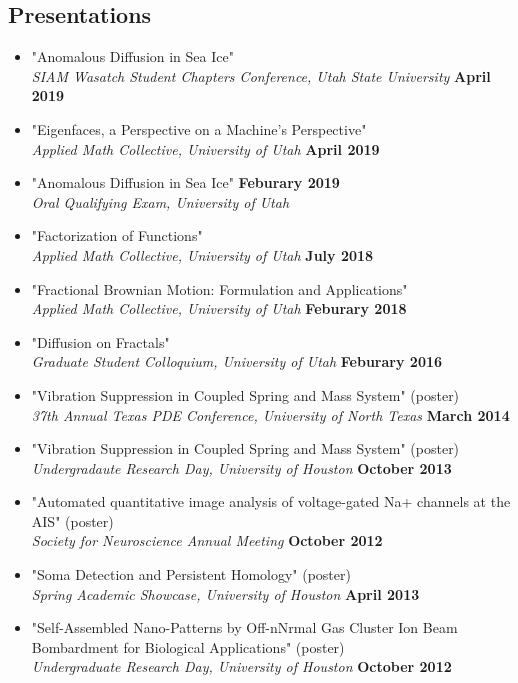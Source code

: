 \documentclass[margin,line]{res}
\begin{document}
\begin{resume}
\section{\sc Presentations}
\begin{itemize}
    \item[] "Anomalous Diffusion in Sea Ice"
        \\{\it SIAM Wasatch Student Chapters Conference, Utah State University} \hfill {\bf April 2019} 
    \item[] "Eigenfaces, a Perspective on a Machine's Perspective"
        \\{\it Applied Math Collective, University of Utah} \hfill {\bf April 2019}
    \item[] "Anomalous Diffusion in Sea Ice" \hfill {\bf Feburary 2019} 
        \\ {\it Oral Qualifying Exam, University of Utah }
    \item[] "Factorization of Functions" 
        \\ {\it Applied Math Collective, University of Utah } \hfill {\bf July 2018} 
    \item[] "Fractional Brownian Motion: Formulation and Applications"
        \\ {\it Applied Math Collective, University of Utah} \hfill {\bf Feburary 2018} 
    \item[] "Diffusion on Fractals"
        \\ {\it Graduate Student Colloquium, University of Utah} \hfill {\bf Feburary 2016} 
    \item[] "Vibration Suppression in Coupled Spring and Mass System" (poster)
        \\ {\it 37th Annual Texas PDE Conference, University of North Texas} \hfill {\bf March 2014} 
    \item[] "Vibration Suppression in Coupled Spring and Mass System" (poster)
        \\ {\it Undergradaute Research Day, University of Houston} \hfill {\bf October 2013} 
    \item[] "Automated quantitative image analysis of voltage-gated Na+ channels at the AIS" (poster) 
    \\ {\it Society for Neuroscience Annual Meeting} \hfill {\bf October 2012} 
    \item[] "Soma Detection and Persistent Homology" (poster) 
    \\ {\it Spring Academic Showcase, University of Houston} \hfill {\bf April 2013} 
    \item[] "Self-Assembled Nano-Patterns by Off-nNrmal Gas Cluster Ion Beam Bombardment for Biological Applications" (poster) 
    \\ {\it Undergraduate Research Day, University of Houston} \hfill {\bf October 2012} 
\end{itemize}


\end{resume}
\end{document}
